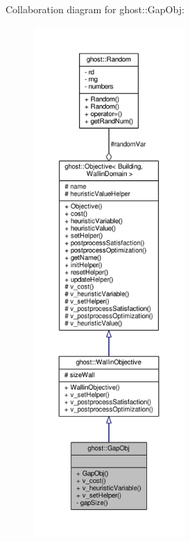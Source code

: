 Collaboration diagram for ghost\-:\-:Gap\-Obj\-:\nopagebreak
\begin{figure}[H]
\begin{center}
\leavevmode
\includegraphics[height=550pt]{classghost_1_1GapObj__coll__graph}
\end{center}
\end{figure}

